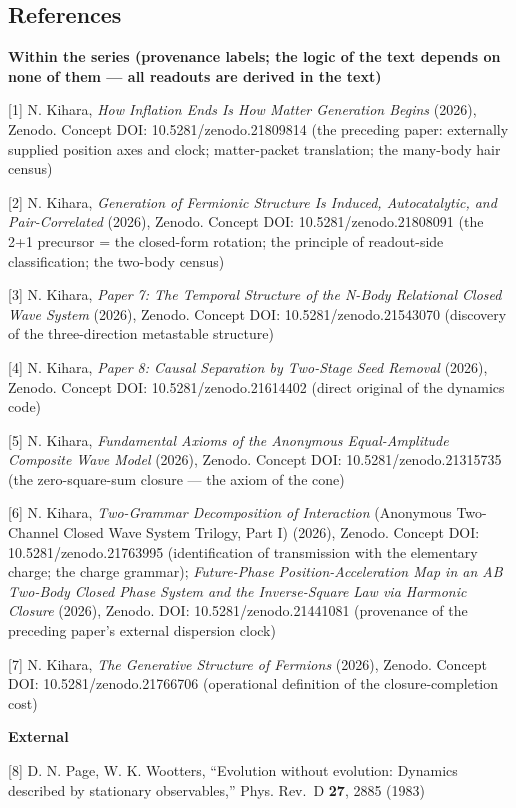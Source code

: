 \documentclass[
  a4paper,
]{article}
\newcounter{none} %
\begin{document}
\subsection{References}\label{references}

\textbf{Within the series (provenance labels; the logic of the text
depends on none of them --- all readouts are derived in the text)}

{[}1{]} N. Kihara, \emph{How Inflation Ends Is How Matter Generation
Begins} (2026), Zenodo. Concept DOI: 10.5281/zenodo.21809814 (the
preceding paper: externally supplied position axes and clock;
matter-packet translation; the many-body hair census)

{[}2{]} N. Kihara, \emph{Generation of Fermionic Structure Is Induced,
Autocatalytic, and Pair-Correlated} (2026), Zenodo. Concept DOI:
10.5281/zenodo.21808091 (the 2+1 precursor = the closed-form rotation;
the principle of readout-side classification; the two-body census)

{[}3{]} N. Kihara, \emph{Paper 7: The Temporal Structure of the N-Body
Relational Closed Wave System} (2026), Zenodo. Concept DOI:
10.5281/zenodo.21543070 (discovery of the three-direction metastable
structure)

{[}4{]} N. Kihara, \emph{Paper 8: Causal Separation by Two-Stage Seed
Removal} (2026), Zenodo. Concept DOI: 10.5281/zenodo.21614402 (direct
original of the dynamics code)

{[}5{]} N. Kihara, \emph{Fundamental Axioms of the Anonymous
Equal-Amplitude Composite Wave Model} (2026), Zenodo. Concept DOI:
10.5281/zenodo.21315735 (the zero-square-sum closure --- the axiom of
the cone)

{[}6{]} N. Kihara, \emph{Two-Grammar Decomposition of Interaction}
(Anonymous Two-Channel Closed Wave System Trilogy, Part I) (2026),
Zenodo. Concept DOI: 10.5281/zenodo.21763995 (identification of
transmission with the elementary charge; the charge grammar);
\emph{Future-Phase Position-Acceleration Map in an AB Two-Body Closed
Phase System and the Inverse-Square Law via Harmonic Closure} (2026),
Zenodo. DOI: 10.5281/zenodo.21441081 (provenance of the preceding
paper's external dispersion clock)

{[}7{]} N. Kihara, \emph{The Generative Structure of Fermions} (2026),
Zenodo. Concept DOI: 10.5281/zenodo.21766706 (operational definition of
the closure-completion cost)

\textbf{External}

{[}8{]} D. N. Page, W. K. Wootters, ``Evolution without evolution:
Dynamics described by stationary observables,'' Phys. Rev.~D
\textbf{27}, 2885 (1983)
\end{document}
